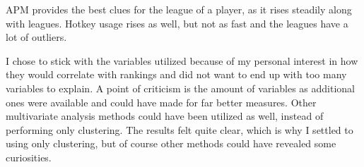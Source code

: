 \documentclass{article}
\begin{document}
APM provides the best clues for the league of a player, as it rises steadily along with leagues. Hotkey usage rises as well, but not as fast and the leagues have a lot of outliers.

I chose to stick with the variables utilized because of my personal interest in how they would correlate with rankings and did not want to end up with too many variables to explain. A point of criticism is the amount of variables as additional ones were available and could have made for far better measures. Other multivariate analysis methods could have been utilized as well, instead of performing only clustering. The results felt quite clear, which is why I settled to using only clustering, but of course other methods could have revealed some curiosities.
\end{document}
